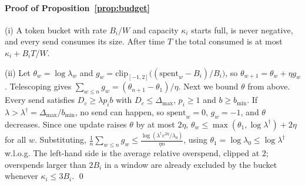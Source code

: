 \paragraph{Proof of Proposition~\ref{prop:budget}}
(i) A token bucket with rate $B_i/W$ and capacity $\kappa_i$ starts full, is never negative, and every send consumes its size. After time $T$ the total consumed is at most $\kappa_i+B_iT/W$.

(ii) Let $\theta_w=\log\lambda_w$ and $g_w=\mathrm{clip}_{[-1,2]}\big((\text{spent}_w-B_i)/B_i\big)$, so $\theta_{w+1}=\theta_w+\eta g_w$. Telescoping gives $\sum_{w\le n}g_w=(\theta_{n+1}-\theta_1)/\eta$. Next we bound $\theta$ from above. Every send satisfies $D_c\ge\lambda p_i b$ with $D_c\le\Delta_\text{max}$, $p_i\ge1$ and $b\ge b_\text{min}$. If $\lambda>\lambda^\dagger=\Delta_\text{max}/b_\text{min}$, no send can happen, so $\text{spent}_w=0$, $g_w=-1$, and $\theta$ decreases. Since one update raises $\theta$ by at most $2\eta$, $\theta_w\le\max(\theta_1,\log\lambda^\dagger)+2\eta$ for all $w$. Substituting, $\frac1n\sum_{w\le n}g_w\le\frac{\log(\lambda^\dagger e^{2\eta}/\lambda_0)}{\eta n}$, using $\theta_1=\log\lambda_0\le\log\lambda^\dagger$ w.l.o.g. The left-hand side is the average relative overspend, clipped at $2$; overspends larger than $2B_i$ in a window are already excluded by the bucket whenever $\kappa_i\le3B_i$. \qed
